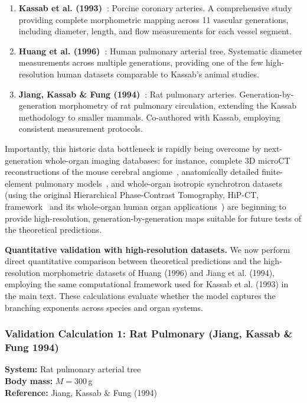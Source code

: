 \documentclass[11pt,a4paper]{article}
\theoremstyle{remark}
\begin{document}
\begin{enumerate}
    \item
\textbf{Kassab et al. (1993)~\cite{kassab1993}}: Porcine coronary arteries. A
comprehensive study providing complete morphometric mapping across 11 vascular
generations, including diameter, length, and flow measurements for each vessel
segment.

    \item
\textbf{Huang et al. (1996)~\cite{huang1996}}: Human pulmonary arterial tree.
Systematic diameter measurements across multiple generations, providing one of
the few high-resolution human datasets comparable to Kassab's animal studies.

    \item
\textbf{Jiang, Kassab \& Fung (1994)~\cite{jiang1994}}: Rat pulmonary arteries.
Generation-by-generation morphometry of rat pulmonary circulation, extending the
Kassab methodology to smaller mammals. Co-authored with Kassab, employing
consistent measurement protocols.
\end{enumerate}

Importantly, this historic data bottleneck is rapidly being overcome by
next-generation whole-organ imaging databases: for instance, complete 3D microCT
reconstructions of the mouse cerebral angiome~\cite{quintana2019}, anatomically
detailed finite-element pulmonary models~\cite{burrowes2005}, and whole-organ
isotropic synchrotron datasets (using the original Hierarchical Phase-Contrast
Tomography, HiP-CT, framework~\cite{walsh2021} and its whole-organ human organ
applications~\cite{chourrout2026}) are beginning to provide
high-resolution, generation-by-generation maps suitable for future tests of the
theoretical predictions.


\textbf{Quantitative validation with high-resolution datasets.} We now perform
direct quantitative comparison between theoretical predictions and the
high-resolution morphometric datasets of Huang (1996) and Jiang et al. (1994),
employing the same computational framework used for Kassab et al. (1993) in the
main text. These calculations evaluate whether the model captures the branching
exponents across species and organ systems.

\subsubsection{Validation Calculation 1: Rat Pulmonary (Jiang, Kassab \& Fung 1994)}
\label{sec:S_val_rat}

\textbf{System:} Rat pulmonary arterial tree\\
\textbf{Body mass:} $M = 300\,$g\\
\textbf{Reference:} Jiang, Kassab \& Fung (1994)~\cite{jiang1994}
\end{document}
